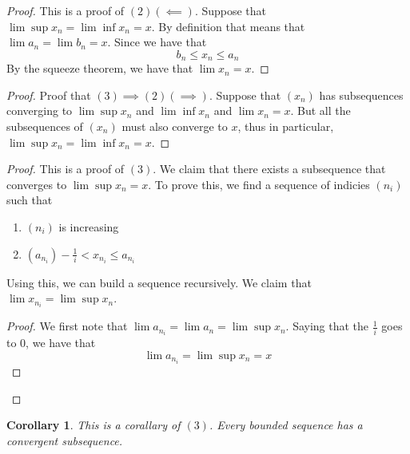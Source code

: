 \documentclass{article}
\newtheorem{corollary}[theorem]{Corollary}
\newtheorem{one minute paper}[theorem]{One Minute Paper}
\begin{document}
\begin{proof}
    This is a proof of $(2) (\impliedby)$. Suppose that $\lim \sup x_n = \lim \inf x_n = x$. By definition that means that $\lim a_n = \lim b_n = x$. Since we have that 
    \begin{equation}
        b_n \leq x_n \leq a_n
    \end{equation} 
    By the squeeze theorem, we have that $\lim x_n = x$.
\end{proof}

\begin{proof}
    Proof that $(3) \implies (2) (\implies)$. Suppose that $(x_n)$ has subsequences converging to $\lim \sup x_n$ and $\lim \inf x_n$ and $\lim x_n = x$. But all the subsequences of $(x_n)$ must also
    converge to $x$, thus in particular, $\lim \sup x_n = \lim \inf x_n = x$. 
\end{proof}

\begin{proof}
    This is a proof of $(3)$. We claim that there exists a subsequence that converges to $\lim \sup x_n = x$. To prove this, we find a sequence of indicies $(n_{i})$ such that 
    \begin{enumerate}
        \item $(n_i)$ is increasing
        \item $(a_{n_i}) - \frac{1}{i} < x_{n_i} \leq a_{n_i}$
    \end{enumerate}
    Using this, we can build a sequence recursively. We claim that $\lim x_{n_i} = \lim \sup x_n$. 
    \begin{proof}
        We first note that $\lim a_{n_i} = \lim a_n = \lim \sup x_n$. Saying that the $\frac{1}{i}$ goes to $0$, we have that 
        \begin{equation}
            \lim a_{n_i} = \lim \sup x_n = x
        \end{equation}
    \end{proof}
\end{proof}

\begin{corollary}
    This is a corallary of $(3)$. Every bounded sequence has a convergent subsequence. 
\end{corollary}
\end{document}
